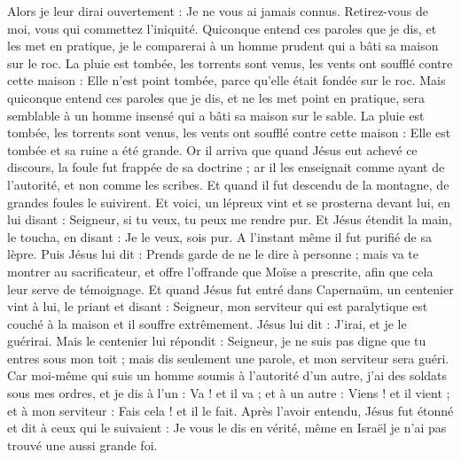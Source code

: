 \begin{multicols}{2}
Alors je leur dirai ouvertement : Je ne vous ai jamais connus. Retirez-vous de moi, vous qui commettez l'iniquité.
Quiconque entend ces paroles que je dis, et les met en pratique, je le comparerai à un homme prudent qui a bâti sa maison sur le roc.
La pluie est tombée, les torrents sont venus, les vents ont soufflé contre cette maison : Elle n'est point tombée, parce qu'elle était fondée sur le roc.
Mais quiconque entend ces paroles que je dis, et ne les met point en pratique, sera semblable à un homme insensé qui a bâti sa maison sur le sable.
La pluie est tombée, les torrents sont venus, les vents ont soufflé contre cette maison : Elle est tombée et sa ruine a été grande.
Or il arriva que quand Jésus eut achevé ce discours, la foule fut frappée de sa doctrine ;
ar il les enseignait comme ayant de l'autorité, et non comme les scribes.
\VerseOne{}Et quand il fut descendu de la montagne, de grandes foules le suivirent.
Et voici, un lépreux vint et se prosterna devant lui, en lui disant : Seigneur, si tu veux, tu peux me rendre pur.
Et Jésus étendit la main, le toucha, en disant : Je le veux, sois pur. A l'instant même il fut purifié de sa lèpre.
Puis Jésus lui dit : Prends garde de ne le dire à personne ; mais va te montrer au sacrificateur, et offre l'offrande que Moïse a prescrite, afin que cela leur serve de témoignage.
Et quand Jésus fut entré dans Capernaüm, un centenier vint à lui, le priant
et disant : Seigneur, mon serviteur qui est paralytique est couché à la maison et il souffre extrêmement.
Jésus lui dit : J'irai, et je le guérirai.
Mais le centenier lui répondit : Seigneur, je ne suis pas digne que tu entres sous mon toit ; mais dis seulement une parole, et mon serviteur sera guéri.
Car moi-même qui suis un homme soumis à l'autorité d'un autre, j'ai des soldats sous mes ordres, et je dis à l'un : Va ! et il va ; et à un autre : Viens ! et il vient ; et à mon serviteur : Fais cela ! et il le fait.
Après l'avoir entendu, Jésus fut étonné et dit à ceux qui le suivaient : Je vous le dis en vérité, même en Israël je n'ai pas trouvé une aussi grande foi.

\end{multicols}
